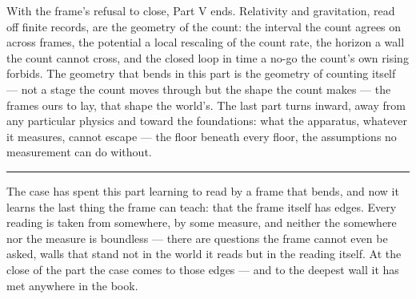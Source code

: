 \bigskip

With the frame's refusal to close, Part V ends. Relativity and gravitation, read off finite records, are the
geometry of the count: the interval the count agrees on across frames, the potential a local rescaling of the
count rate, the horizon a wall the count cannot cross, and the closed loop in time a no-go the count's own
rising forbids. The geometry that bends in this part is the geometry of counting itself --- not a stage the
count moves through but the shape the count makes --- the frames ours to lay, that shape the world's. The last
part turns inward, away from any particular physics
and toward the foundations: what the apparatus, whatever it measures, cannot escape --- the floor beneath every
floor, the assumptions no measurement can do without.

\bigskip
\begin{center}
\rule{0.4\textwidth}{0.4pt}
\end{center}
\bigskip

\noindent The case has spent this part learning to read by a frame that bends, and now it learns the last thing
the frame can teach: that the frame itself has edges. Every reading is taken from somewhere, by some measure,
and neither the somewhere nor the measure is boundless --- there are questions the frame cannot even be asked,
walls that stand not in the world it reads but in the reading itself. At the close of the part the case comes to
those edges --- and to the deepest wall it has met anywhere in the book.

